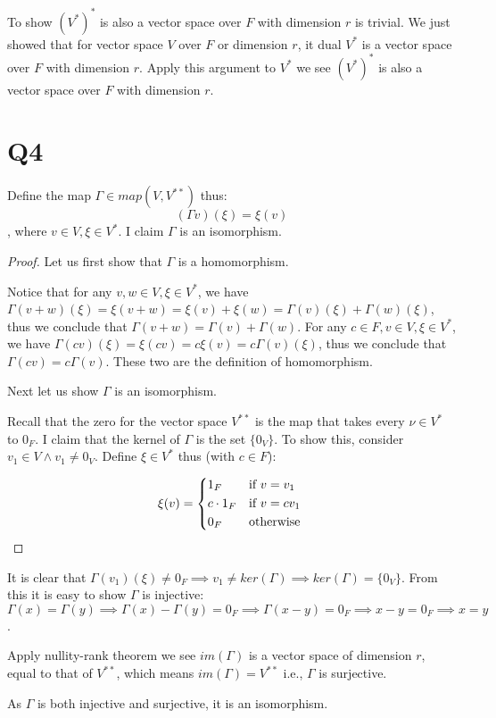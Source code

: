 \documentclass[12pt, a4paper]{article}
\theoremstyle{definition}
\theoremstyle{remark}
\begin{document}
To show $(V^*)^*$ is also a vector space over $F$ with dimension $r$ is trivial. We just showed that for vector space $V$ over $F$ or dimension $r$, it dual $V^*$ is a vector space over $F$ with dimension $r$. Apply this argument to $V^*$ we see $(V^*)^*$ is also a vector space over $F$ with dimension $r$.

\section{Q4}

Define the map $\Gamma \in map(V, V^{**})$ thus:
$$(\Gamma v)(\xi) = \xi (v)$$
, where $v \in V, \xi \in V^*$. I claim $\Gamma$ is an isomorphism. 

\begin{proof}
Let us first show that $\Gamma$ is a homomorphism.

Notice that for any $v, w \in V, \xi \in V^* $, we have $\Gamma(v+w) (\xi) = \xi(v + w) = \xi(v) + \xi(w) = \Gamma(v) (\xi) + \Gamma(w) (\xi)$, thus we conclude that $\Gamma(v+w) = \Gamma(v) + \Gamma(w)$.
For any $c \in F, v \in V, \xi \in V^*$, we have $\Gamma(cv) (\xi) = \xi(cv) = c \xi(v) = c\Gamma(v) (\xi)$, thus we conclude that $\Gamma(cv) = c\Gamma(v)$. These two are the definition of homomorphism.

Next let us show $\Gamma$ is an isomorphism.

Recall that the zero for the vector space $V^{**}$ is the map that takes every $\nu \in V^*$ to $0_F$. I claim that the kernel of $\Gamma$ is the set $\{0_V\}$. To show this, consider $v_1 \in V \land v_1 \neq 0_V$. Define $\xi \in V^*$ thus (with $c \in F$): 

\[
\xi (v) = \begin{dcases*}
1_F & if $v = v_1$ \\
c \cdot 1_F & if $v = cv_1$ \\
0_F & otherwise
\end{dcases*}
\]
\end{proof}

It is clear that $\Gamma (v_1) (\xi) \neq 0_F \implies v_1 \neq ker(\Gamma) \implies ker(\Gamma) =\{0_V\}$. 
From this it is easy to show $\Gamma$ is injective: $\Gamma (x) = \Gamma(y) \implies \Gamma(x) - \Gamma(y) = 0_F \implies \Gamma(x-y) = 0_F \implies x - y = 0_F \implies x = y$.

Apply nullity-rank theorem we see $im(\Gamma)$ is a vector space of dimension $r$, equal to that of $V^{**}$, which means $im(\Gamma) = V^{**}$ i.e., $\Gamma$ is surjective.

As $\Gamma$ is both injective and surjective, it is an isomorphism.
\end{document}

